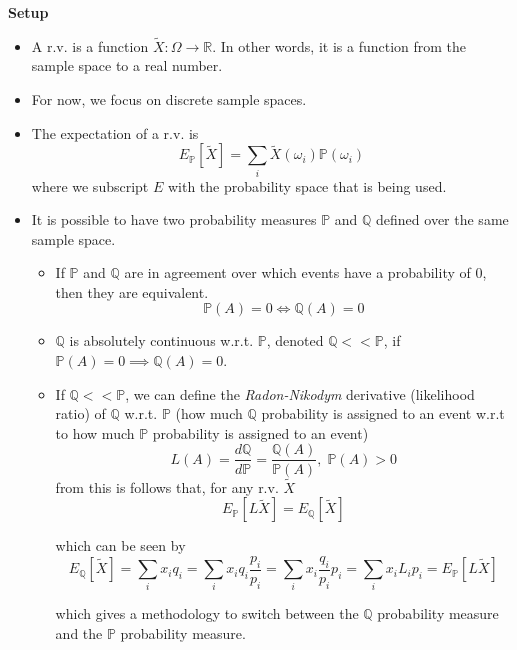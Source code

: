 \documentclass[11pt]{article}
\begin{document}
\textbf{Setup}
\begin{itemize}
    \item A r.v. is a function $\tilde{X}: \Omega \rightarrow \mathbb{R}$. In other words, it 
    is a function from the sample space to a real number. 
    \item For now, we focus on discrete sample spaces.
    \item The expectation of a r.v. is 
    \[E_{\mathbb{P}}[\tilde{X}] = \sum_{i} \tilde{X}(\omega_i)\mathbb{P}(\omega_i)\]
    where we subscript $E$ with the probability space that is being used.
    \item It is possible to have two probability measures $\mathbb{P}$ and $\mathbb{Q}$ defined 
    over the same sample space. 
    \begin{itemize}
        \item If $\mathbb{P}$ and $\mathbb{Q}$ are in agreement over which events have a 
        probability of 0, then they are equivalent. 
        \[\mathbb{P}(A) = 0 \iff \mathbb{Q}(A) = 0\]
        \item $\mathbb{Q}$ is absolutely continuous w.r.t. $\mathbb{P}$, denoted $\mathbb{Q} << 
        \mathbb{P}$, if $\mathbb{P}(A) = 0 \implies \mathbb{Q}(A) = 0$.
        \item If $\mathbb{Q} << \mathbb{P}$, we can define the \textit{Radon-Nikodym} 
        derivative (likelihood ratio) of $\mathbb{Q}$ w.r.t. $\mathbb{P}$ (how much 
        $\mathbb{Q}$ probability is assigned to an event w.r.t to how much $\mathbb{P}$ 
        probability is assigned to an event)
        \[L(A) = \frac{d\mathbb{Q}}{d\mathbb{P}} = \frac{\mathbb{Q}(A)}{\mathbb{P}(A)}, \; 
        \mathbb{P}(A) > 0\]
        from this is follows that, for any r.v. $\tilde{X}$
        \[E_{\mathbb{P}}[L\tilde{X}] = E_{\mathbb{Q}}[\tilde{X}]\]

        which can be seen by 
        \[
        E_{\mathbb{Q}}[\tilde{X}] 
        = \sum_{i} x_i q_i
        = \sum_{i} x_i q_i \frac{p_i}{p_i}
        = \sum_{i} x_i \frac{q_i}{p_i} p_i
        = \sum_{i} x_i L_i p_i
        = E_{\mathbb{P}}[L\tilde{X}]
        \]

        which gives a methodology to switch between the $\mathbb{Q}$ probability measure and 
        the $\mathbb{P}$ probability measure. 
    \end{itemize}
\end{itemize}
\end{document}
